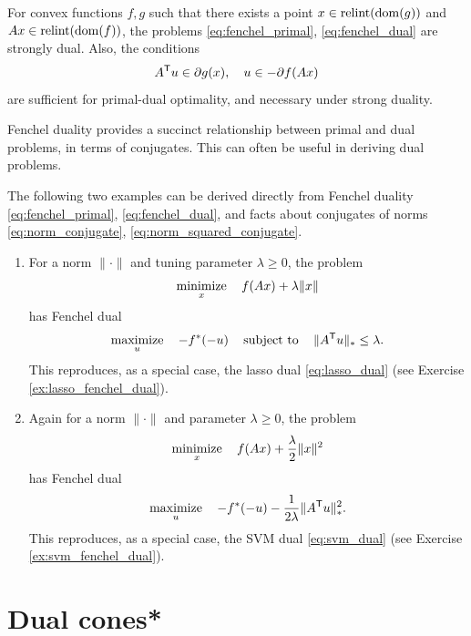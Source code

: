 \begin{Corollary}
\label{cor:fenchel_dual}
For convex functions $f,g$ such that there exists a point $x \in
\operatorname{relint}(\operatorname{dom}(g))$ and $Ax \in \operatorname{relint}(\operatorname{dom}(f))$, the problems 
\eqref{eq:fenchel_primal}, \eqref{eq:fenchel_dual} are strongly
dual. Also, the conditions  
\[
A^{\mathsf{T}} u \in \partial g(x), \quad u \in - \partial f(Ax)
\]
are sufficient for primal-dual optimality, and necessary under strong duality.   
\end{Corollary}

Fenchel duality provides a succinct relationship between primal and dual
problems, in terms of conjugates. This can often be useful in deriving dual
problems.

\begin{Example}
The following two examples can be derived directly from Fenchel duality
\eqref{eq:fenchel_primal}, \eqref{eq:fenchel_dual}, and facts about conjugates
of norms \eqref{eq:norm_conjugate}, \eqref{eq:norm_squared_conjugate}.

\begin{enumerate}[label=\alph*., ref=\alph*]
\item {}
For a norm $\|\cdot\|$ and tuning parameter $\lambda \geq 0$, the problem    
\[
\operatorname*{minimize}_x \quad f(Ax) + \lambda \|x\| 
\]
has Fenchel dual 
\[
\operatorname*{maximize}_u \quad -f^*(-u) \quad \operatorname{subject\,\,to} \quad \|A^{\mathsf{T}} u\|_* \leq \lambda.        
\]
This reproduces, as a special case, the lasso dual \eqref{eq:lasso_dual} (see
Exercise \ref{ex:lasso_fenchel_dual}). 

\item {}
Again for a norm $\|\cdot\|$ and parameter $\lambda \geq 0$, the problem   
\[
\operatorname*{minimize}_x \quad f(Ax) + \frac{\lambda}{2} \|x\|^2
\]
has Fenchel dual 
\[
\operatorname*{maximize}_u \quad -f^*(-u) - \frac{1}{2\lambda} \|A^{\mathsf{T}} u\|_*^2. 
\]
This reproduces, as a special case, the SVM dual \eqref{eq:svm_dual} (see
Exercise \ref{ex:svm_fenchel_dual}). 
\end{enumerate}
\end{Example}

\section{Dual cones*}
\label{sec:dual_cones}

